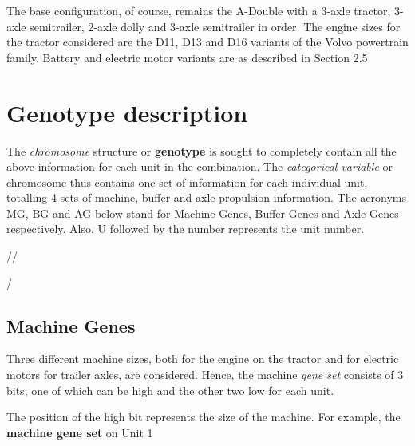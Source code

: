 \documentclass[ExampleMasters.tex]{subfiles}
\begin{document}
		The base configuration, of course, remains the A-Double with a 3-axle tractor, 3-axle semitrailer, 2-axle dolly and 3-axle semitrailer in order. The engine sizes for the tractor considered are the D11, D13 and D16 variants of the Volvo powertrain family. Battery and electric motor variants are as described in Section 2.5\\

	\section{Genotype description}
		
		The \textit{chromosome} structure or \textbf{genotype} is sought to completely contain all the above information for each unit in the combination. The \textit{categorical variable} or chromosome thus contains one set of information for each individual unit, totalling 4 sets of machine, buffer and axle propulsion information. The acronyms MG, BG and AG below stand for Machine Genes, Buffer Genes and Axle Genes respectively. Also, U followed by the number represents the unit number.\\

		\centerline{//\\}
		\centerline{/\\}

		\subsection{Machine Genes}
			Three different machine sizes, both for the engine on the tractor and for electric motors for trailer axles, are considered. Hence, the machine \textit{gene set} consists of 3 bits, one of which can be high and the other two low for each unit.\\

			\centerline{}
			\vspace{0.1in}

			The position of the high bit represents the size of the machine. For example, the \textbf{machine gene set} on Unit 1\\

			\centerline{}
			\vspace{0.1in}
\end{document}
